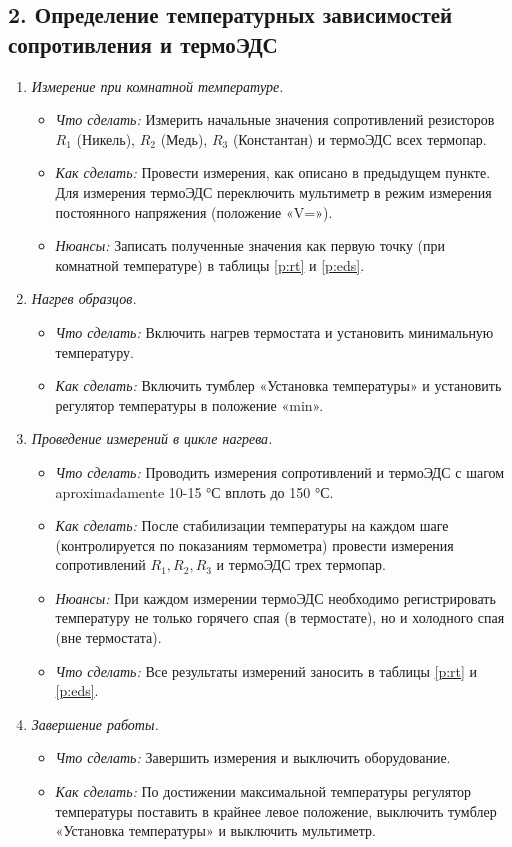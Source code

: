 \subsection*{2. Определение температурных зависимостей сопротивления и термоЭДС}
\begin{enumerate}
    \item \textit{Измерение при комнатной температуре.}
    \begin{itemize}
        \item \textit{Что сделать:} Измерить начальные значения сопротивлений резисторов $R_1$ (Никель), $R_2$ (Медь), $R_3$ (Константан) и термоЭДС всех термопар.
        \item \textit{Как сделать:} Провести измерения, как описано в предыдущем пункте. Для измерения термоЭДС переключить мультиметр в режим измерения постоянного напряжения (положение «V=»).
        \item \textit{Нюансы:} Записать полученные значения как первую точку (при комнатной температуре) в таблицы \cref{p:rt} и \cref{p:eds}.
    \end{itemize}
    \item \textit{Нагрев образцов.}
    \begin{itemize}
        \item \textit{Что сделать:} Включить нагрев термостата и установить минимальную температуру.
        \item \textit{Как сделать:} Включить тумблер «Установка температуры» и установить регулятор температуры в положение «min».
    \end{itemize}
    \item \textit{Проведение измерений в цикле нагрева.}
    \begin{itemize}
        \item \textit{Что сделать:} Проводить измерения сопротивлений и термоЭДС с шагом aproximadamente 10-15 °С вплоть до 150 °С.
        \item \textit{Как сделать:} После стабилизации температуры на каждом шаге (контролируется по показаниям термометра) провести измерения сопротивлений $R_1, R_2, R_3$ и термоЭДС трех термопар.
        \item \textit{Нюансы:} При каждом измерении термоЭДС необходимо регистрировать температуру не только горячего спая (в термостате), но и холодного спая (вне термостата).
        \item \textit{Что сделать:} Все результаты измерений заносить в таблицы \cref{p:rt} и \cref{p:eds}.
    \end{itemize}
    \item \textit{Завершение работы.}
    \begin{itemize}
        \item \textit{Что сделать:} Завершить измерения и выключить оборудование.
        \item \textit{Как сделать:} По достижении максимальной температуры регулятор температуры поставить в крайнее левое положение, выключить тумблер «Установка температуры» и выключить мультиметр.
    \end{itemize}
\end{enumerate}

